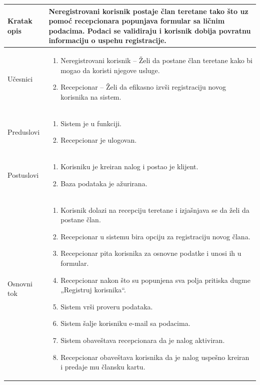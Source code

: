 \documentclass[../main.tex]{subfiles}
\begin{document}
\begin{longtable}{| p{} | p{} |} 
\hline
    Kratak opis &  Neregistrovani korisnik postaje član teretane tako što uz pomoć recepcionara popunjava formular sa ličnim podacima. Podaci se validiraju i korisnik dobija povratnu informaciju o uspehu registracije.\\ 
\hline    
    Učesnici & \begin{enumerate}
        \item Neregistrovani korisnik – Želi da postane član teretane kako bi mogao da koristi njegove usluge.
        \item Recepcionar – Želi da efikasno izvši registraciju novog korisnika na sistem.
     \end{enumerate}\\
\hline
   Preduslovi & \begin{enumerate}
       \item Sistem je u funkciji.
       \item Recepcionar je ulogovan.
   \end{enumerate}\\
\hline  
    Postuslovi & \begin{enumerate}
        \item Korisniku je kreiran nalog i postao je klijent.
        \item Baza podataka je ažurirana.
    \end{enumerate}\\
\hline
    Osnovni tok & \begin{enumerate}
        \item Korisnik dolazi na recepciju teretane i izjašnjava se da želi da postane član.
        \item Recepcionar u sistemu bira opciju za registraciju novog člana.
        \item Recepcionar pita korisnika za osnovne podatke i unosi ih u formular.
        \item Recepcionar nakon što su popunjena sva polja pritiska dugme „Registruj korisnika“.
        \item Sistem vrši proveru podataka.
        \item Sistem šalje korisniku e-mail sa podacima.
        \item Sistem obaveštava recepcionara da je nalog aktiviran.
        \item Recepcionar obaveštava korisnika da je nalog uspešno kreiran i predaje mu člansku kartu.

\end{enumerate}
\end{longtable}
\end{document}
